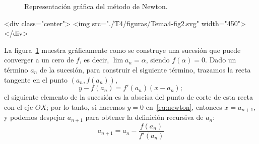 \begin{latexonly}
\begin{figure}
\begin{center}
\end{center}
\caption{Representación gráfica del método de Newton.}\label{fig:newton}
\end{figure}
\end{latexonly}
\begin{rawhtml}
<div class="center">
<img src="./T4/figuras/Tema4-fig2.svg" width="450">
</div>
\end{rawhtml}

La figura~\ref{fig:newton} muestra gráficamente como se construye una sucesión que puede converger a un cero de $f$, es decir, $\lim a_n=\alpha$, siendo $f(\alpha)=0$.
Dado un término $a_n$ de la sucesión, para construir el siguiente término, trazamos la recta tangente en el punto $(a_n,f(a_n))$,
\begin{equation}\label{eq:newton}
y-f(a_n) = f'(a_n)(x-a_n);
\end{equation}
el siguiente elemento de la sucesión es la abscisa del punto de corte de esta recta con el eje $OX$;
por lo tanto, si hacemos $y=0$ en~\eqref{eq:newton}, entonces $x=a_{n+1}$, y podemos despejar $a_{n+1}$ para obtener la definición recursiva de $a_n$:
\begin{equation}\label{MetNewton}
a_{n+1}=a_n-\dfrac{f(a_n)}{f'(a_n)}
\end{equation}

